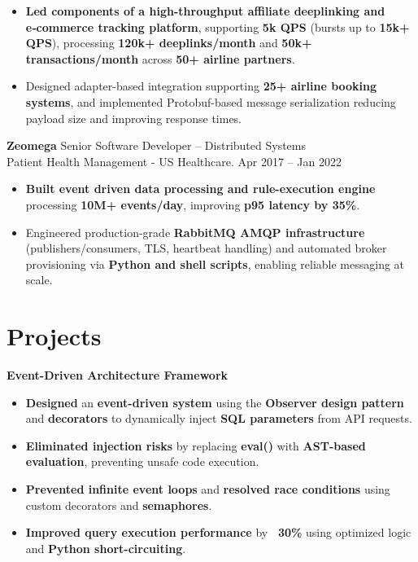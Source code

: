 \documentclass[11 pt]{article}
\begin{document}
\begin{itemize}
\item \textbf{Led components of a high-throughput affiliate deeplinking and e‑commerce tracking platform}, supporting \textbf{5k QPS} (bursts up to \textbf{15k+ QPS}), processing \textbf{120k+ deeplinks/month} and \textbf{50k+ transactions/month} across \textbf{50+ airline partners}.

\item Designed adapter-based integration supporting \textbf{25+ airline booking systems}, and implemented Protobuf-based message serialization reducing payload size and improving response times.
\end{itemize}

\vspace{6pt}

\noindent
{\normalsize\textbf{Zeomega}} \hfill \small{Senior Software Developer – Distributed Systems} \\
{Patient Health Management - US Healthcare. \hfill Apr 2017 -- Jan 2022}

\begin{itemize}
\item \textbf{Built event driven data processing and rule-execution engine} processing \textbf{10M+ events/day}, improving \textbf{p95 latency by 35\%}.

\item Engineered production-grade \textbf{RabbitMQ AMQP infrastructure} (publishers/consumers, TLS, heartbeat handling) and automated broker provisioning via \textbf{Python and shell scripts}, enabling reliable messaging at scale.
\end{itemize}




\section*{\textbf{Projects}}

\noindent\textbf{Event-Driven Architecture Framework}
\begin{itemize}
  \item \textbf{Designed} an \textbf{event-driven system} using the \textbf{Observer design pattern} and \textbf{decorators} to dynamically inject \textbf{SQL parameters} from API requests.
  \item \textbf{Eliminated injection risks} by replacing \textbf{eval()} with \textbf{AST-based evaluation}, preventing unsafe code execution.
  \item \textbf{Prevented infinite event loops} and \textbf{resolved race conditions} using custom decorators and \textbf{semaphores}.
  \item \textbf{Improved query execution performance} by \textbf{~30\%} using optimized logic and \textbf{Python short-circuiting}.
\end{itemize}
\vspace{6pt}
\end{document}

